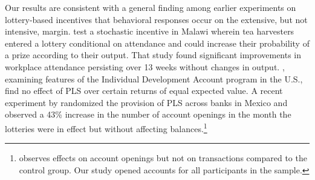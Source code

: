 \documentclass[11pt]{article}
\begin{document}
		





		Our results are consistent with a general finding among earlier experiments on lottery-based incentives that behavioral responses occur on the extensive, but not intensive, margin. \textcite{brune_effect_2015} test a stochastic incentive in Malawi wherein tea harvesters entered a lottery conditional on attendance and could increase their probability of a prize according to their output. That study found significant improvements in workplace attendance persisting over 13 weeks without changes in output. \textcite{loibl_testing_2016}, examining features of the Individual Development Account program in the U.S., find no effect of PLS over certain returns of equal expected value. A recent experiment by \textcite{gertler_long-term_2017} randomized the provision of PLS across banks in Mexico and observed a 43\% increase in the number of account openings in the month the lotteries were in effect but without affecting balances.\footnote{\textcite{gertler_long-term_2017} observes effects on account openings but not on transactions compared to the control group. Our study opened accounts for all participants in the sample.}
\end{document}
